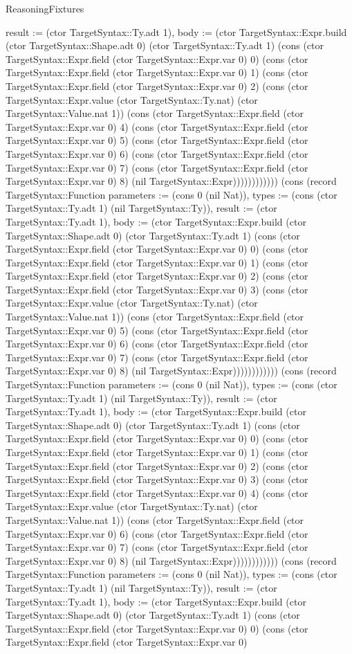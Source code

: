 \begin{lexlean}{ReasoningFixtures}
\begin{semanticmodule}
{result := (ctor TargetSyntax::Ty.adt 1), body := (ctor TargetSyntax::Expr.build (ctor TargetSyntax::Shape.adt 0) (ctor TargetSyntax::Ty.adt 1) (cons (ctor TargetSyntax::Expr.field (ctor TargetSyntax::Expr.var 0) 0) (cons (ctor TargetSyntax::Expr.field (ctor TargetSyntax::Expr.var 0) 1) (cons (ctor TargetSyntax::Expr.field (ctor TargetSyntax::Expr.var 0) 2) (cons (ctor TargetSyntax::Expr.value (ctor TargetSyntax::Ty.nat) (ctor TargetSyntax::Value.nat 1)) (cons (ctor TargetSyntax::Expr.field (ctor TargetSyntax::Expr.var 0) 4) (cons (ctor TargetSyntax::Expr.field (ctor TargetSyntax::Expr.var 0) 5) (cons (ctor TargetSyntax::Expr.field (ctor TargetSyntax::Expr.var 0) 6) (cons (ctor TargetSyntax::Expr.field (ctor TargetSyntax::Expr.var 0) 7) (cons (ctor TargetSyntax::Expr.field (ctor TargetSyntax::Expr.var 0) 8) (nil TargetSyntax::Expr)))))))))))}) (cons (record TargetSyntax::Function {parameters := (cons 0 (nil Nat)), types := (cons (ctor TargetSyntax::Ty.adt 1) (nil TargetSyntax::Ty)), result := (ctor TargetSyntax::Ty.adt 1), body := (ctor TargetSyntax::Expr.build (ctor TargetSyntax::Shape.adt 0) (ctor TargetSyntax::Ty.adt 1) (cons (ctor TargetSyntax::Expr.field (ctor TargetSyntax::Expr.var 0) 0) (cons (ctor TargetSyntax::Expr.field (ctor TargetSyntax::Expr.var 0) 1) (cons (ctor TargetSyntax::Expr.field (ctor TargetSyntax::Expr.var 0) 2) (cons (ctor TargetSyntax::Expr.field (ctor TargetSyntax::Expr.var 0) 3) (cons (ctor TargetSyntax::Expr.value (ctor TargetSyntax::Ty.nat) (ctor TargetSyntax::Value.nat 1)) (cons (ctor TargetSyntax::Expr.field (ctor TargetSyntax::Expr.var 0) 5) (cons (ctor TargetSyntax::Expr.field (ctor TargetSyntax::Expr.var 0) 6) (cons (ctor TargetSyntax::Expr.field (ctor TargetSyntax::Expr.var 0) 7) (cons (ctor TargetSyntax::Expr.field (ctor TargetSyntax::Expr.var 0) 8) (nil TargetSyntax::Expr)))))))))))}) (cons (record TargetSyntax::Function {parameters := (cons 0 (nil Nat)), types := (cons (ctor TargetSyntax::Ty.adt 1) (nil TargetSyntax::Ty)), result := (ctor TargetSyntax::Ty.adt 1), body := (ctor TargetSyntax::Expr.build (ctor TargetSyntax::Shape.adt 0) (ctor TargetSyntax::Ty.adt 1) (cons (ctor TargetSyntax::Expr.field (ctor TargetSyntax::Expr.var 0) 0) (cons (ctor TargetSyntax::Expr.field (ctor TargetSyntax::Expr.var 0) 1) (cons (ctor TargetSyntax::Expr.field (ctor TargetSyntax::Expr.var 0) 2) (cons (ctor TargetSyntax::Expr.field (ctor TargetSyntax::Expr.var 0) 3) (cons (ctor TargetSyntax::Expr.field (ctor TargetSyntax::Expr.var 0) 4) (cons (ctor TargetSyntax::Expr.value (ctor TargetSyntax::Ty.nat) (ctor TargetSyntax::Value.nat 1)) (cons (ctor TargetSyntax::Expr.field (ctor TargetSyntax::Expr.var 0) 6) (cons (ctor TargetSyntax::Expr.field (ctor TargetSyntax::Expr.var 0) 7) (cons (ctor TargetSyntax::Expr.field (ctor TargetSyntax::Expr.var 0) 8) (nil TargetSyntax::Expr)))))))))))}) (cons (record TargetSyntax::Function {parameters := (cons 0 (nil Nat)), types := (cons (ctor TargetSyntax::Ty.adt 1) (nil TargetSyntax::Ty)), result := (ctor TargetSyntax::Ty.adt 1), body := (ctor TargetSyntax::Expr.build (ctor TargetSyntax::Shape.adt 0) (ctor TargetSyntax::Ty.adt 1) (cons (ctor TargetSyntax::Expr.field (ctor TargetSyntax::Expr.var 0) 0) (cons (ctor TargetSyntax::Expr.field (ctor TargetSyntax::Expr.var 0) }
\end{semanticmodule}
\end{lexlean}
